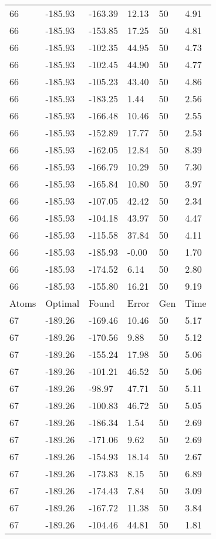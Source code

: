 \documentclass{report}
\begin{document}
\begin{appendix}
\begin{longtable}{llllll}
66 & -185.93 & -163.39 & 12.13 & 50 & 4.91 \\
66 & -185.93 & -153.85 & 17.25 & 50 & 4.81 \\
66 & -185.93 & -102.35 & 44.95 & 50 & 4.73 \\
66 & -185.93 & -102.45 & 44.90 & 50 & 4.77 \\
66 & -185.93 & -105.23 & 43.40 & 50 & 4.86 \\
66 & -185.93 & -183.25 & 1.44 & 50 & 2.56 \\
66 & -185.93 & -166.48 & 10.46 & 50 & 2.55 \\
66 & -185.93 & -152.89 & 17.77 & 50 & 2.53 \\
66 & -185.93 & -162.05 & 12.84 & 50 & 8.39 \\
66 & -185.93 & -166.79 & 10.29 & 50 & 7.30 \\
66 & -185.93 & -165.84 & 10.80 & 50 & 3.97 \\
66 & -185.93 & -107.05 & 42.42 & 50 & 2.34 \\
66 & -185.93 & -104.18 & 43.97 & 50 & 4.47 \\
66 & -185.93 & -115.58 & 37.84 & 50 & 4.11 \\
66 & -185.93 & -185.93 & -0.00 & 50 & 1.70 \\
66 & -185.93 & -174.52 & 6.14 & 50 & 2.80 \\
66 & -185.93 & -155.80 & 16.21 & 50 & 9.19 \\
Atoms & Optimal & Found & Error & Gen & Time \\
67 & -189.26 & -169.46 & 10.46 & 50 & 5.17 \\
67 & -189.26 & -170.56 & 9.88 & 50 & 5.12 \\
67 & -189.26 & -155.24 & 17.98 & 50 & 5.06 \\
67 & -189.26 & -101.21 & 46.52 & 50 & 5.06 \\
67 & -189.26 & -98.97 & 47.71 & 50 & 5.11 \\
67 & -189.26 & -100.83 & 46.72 & 50 & 5.05 \\
67 & -189.26 & -186.34 & 1.54 & 50 & 2.69 \\
67 & -189.26 & -171.06 & 9.62 & 50 & 2.69 \\
67 & -189.26 & -154.93 & 18.14 & 50 & 2.67 \\
67 & -189.26 & -173.83 & 8.15 & 50 & 6.89 \\
67 & -189.26 & -174.43 & 7.84 & 50 & 3.09 \\
67 & -189.26 & -167.72 & 11.38 & 50 & 3.84 \\
67 & -189.26 & -104.46 & 44.81 & 50 & 1.81 \\

\end{longtable}
\end{appendix}
\end{document}
